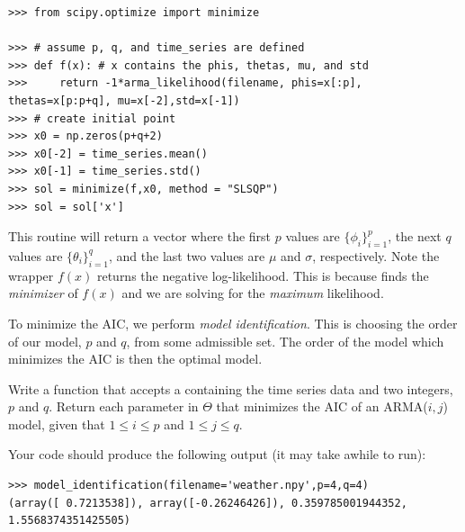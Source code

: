 \begin{lstlisting}
>>> from scipy.optimize import minimize

>>> # assume p, q, and time_series are defined
>>> def f(x): # x contains the phis, thetas, mu, and std
>>>     return -1*arma_likelihood(filename, phis=x[:p], thetas=x[p:p+q], mu=x[-2],std=x[-1])
>>> # create initial point
>>> x0 = np.zeros(p+q+2)
>>> x0[-2] = time_series.mean()
>>> x0[-1] = time_series.std()
>>> sol = minimize(f,x0, method = "SLSQP")
>>> sol = sol['x']
\end{lstlisting}

This routine will return a vector  where the first $p$ values are $\{\phi_i\}_{i=1}^p$, the next $q$ values are $\{\theta_i\}_{i=1}^q$, and the last two values are $\mu$ and $\sigma$, respectively.
Note the wrapper $f(x)$ returns the negative log-likelihood.
This is because  finds the \emph{minimizer} of $f(x)$ and we are solving for the \emph{maximum} likelihood.

To minimize the AIC, we perform \emph{model identification}.
This is choosing the order of our model, $p$ and $q$, from some admissible set.
The order of the model which minimizes the AIC is then the optimal model.

\begin{problem}
\label{prob:model-identification}
Write a function  that accepts a  containing the time series data and two integers, $p$ and $q$. 
Return each parameter in $\Theta$ that minimizes the AIC of an ARMA($i,j$) model, given that $1\leq i \leq p$ and $1\leq j \leq q$.

Your code should produce the following output (it may take awhile to run):
\begin{lstlisting}
>>> model_identification(filename='weather.npy',p=4,q=4)
(array([ 0.7213538]), array([-0.26246426]), 0.359785001944352, 1.5568374351425505)
\end{lstlisting}
\end{problem}


